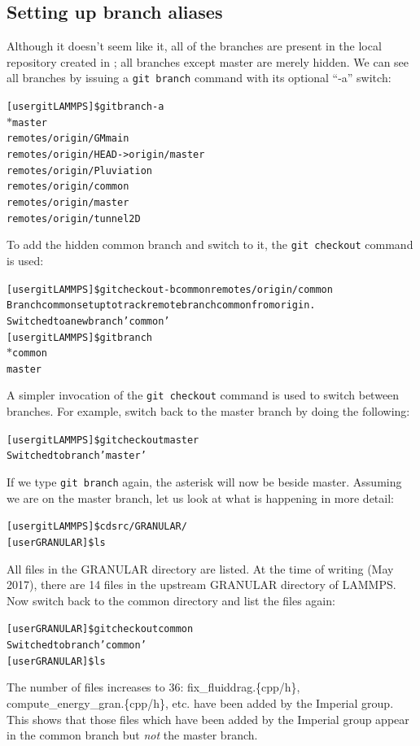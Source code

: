 \documentclass[a4paper,oneside,11pt]{article}
\begin{document}
\subsection{Setting up branch aliases}
Although it doesn't seem like it, all of the branches are present in the local repository created in ; all branches except master are merely hidden. We can see all branches by issuing a \texttt{git branch} command with its optional ``-a'' switch:
\begin{alltt}
[user gitLAMMPS]\$ git branch -a
\(\ast\) master
  remotes/origin/GMmain
  remotes/origin/HEAD -> origin/master
  remotes/origin/Pluviation
  remotes/origin/common
  remotes/origin/master
  remotes/origin/tunnel2D
\end{alltt}
To add the hidden common branch and switch to it, the \texttt{git checkout} command is used:
\begin{alltt}
[user gitLAMMPS]\$ git checkout -b common remotes/origin/common
Branch common set up to track remote branch common from origin.
Switched to a new branch 'common'
[user gitLAMMPS]\$ git branch
\(\ast\) common
  master
\end{alltt}
A simpler invocation of the \texttt{git checkout} command is used to switch between branches. For example, switch back to the master branch by doing the following:
\begin{alltt}
[user gitLAMMPS]\$ git checkout master
Switched to branch 'master'
\end{alltt}
If we type \texttt{git branch} again, the asterisk will now be beside master. Assuming we are on the master branch, let us look at what is happening in more detail:
\begin{alltt}
[user gitLAMMPS]\$ cd src/GRANULAR/
[user GRANULAR]\$ ls
\end{alltt}
All files in the GRANULAR directory are listed. At the time of writing (May 2017), there are 14 files in the upstream GRANULAR directory of LAMMPS. Now switch back to the common directory and list the files again:
\begin{alltt}
[user GRANULAR]\$ git checkout common
Switched to branch 'common'
[user GRANULAR]\$ ls
\end{alltt}
The number of files increases to 36: fix\_fluiddrag.\{cpp\slash h\}, compute\_energy\_gran.\{cpp\slash h\}, etc. have been added by the Imperial group. This shows that those files which have been added by the Imperial group appear in the common branch but \emph{not} the master branch.
\end{document}
